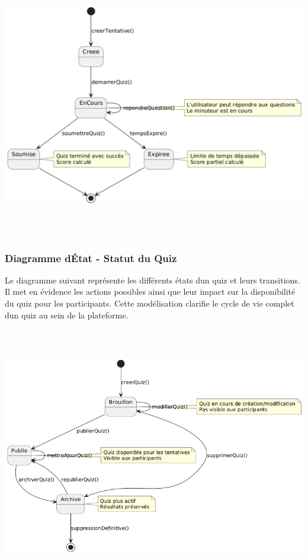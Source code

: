 \documentclass[12pt,a4paper,twoside]{report}
\begin{document}
\includegraphics[width=6.82708in,height=4.57361in]{latex_media/media/image21.png}

\hypertarget{diagramme-duxe9tat---statut-du-quiz}{%
\subsubsection{Diagramme d\textquotesingle État - Statut du
Quiz}\label{diagramme-duxe9tat---statut-du-quiz}}

Le diagramme suivant représente les différents états
d\textquotesingle un quiz et leurs transitions. Il met en évidence les
actions possibles ainsi que leur impact sur la disponibilité du quiz
pour les participants. Cette modélisation clarifie le cycle de vie
complet d\textquotesingle un quiz au sein de la plateforme.

\includegraphics[width=6.27607in,height=4.4375in]{latex_media/media/image22.png}
\end{document}
